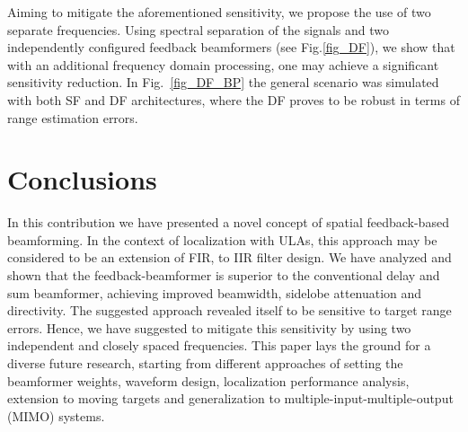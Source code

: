 \documentclass[conference]{IEEEtran}
\begin{document}
\par Aiming to mitigate the aforementioned sensitivity, we propose the use of two separate frequencies. Using spectral separation of the signals and two independently configured feedback beamformers (see Fig.\ref{fig_DF}), we show \cite{myPaper} that with an additional frequency domain processing, one may achieve a significant sensitivity reduction. In Fig.~\ref{fig_DF_BP} the general scenario was simulated with both SF and DF architectures, where the DF proves to be robust in terms of range estimation errors.
\section{Conclusions}\label{sec_conc}
In this contribution we have presented a novel concept of spatial feedback-based beamforming. 
In the context of localization with ULAs, this approach may be considered to be an extension of FIR, to IIR filter design.
We have analyzed and shown that the feedback-beamformer is superior to the conventional delay and sum beamformer,
achieving improved beamwidth, sidelobe attenuation and directivity.
The suggested approach revealed itself to be sensitive to
target range errors. 
Hence, we have suggested to mitigate this sensitivity by using two independent and closely spaced frequencies.
This paper lays the ground for a diverse future research, starting from different approaches of setting the beamformer weights, waveform design, localization performance analysis, extension to moving targets and generalization to multiple-input-multiple-output (MIMO) systems.


\end{document}
